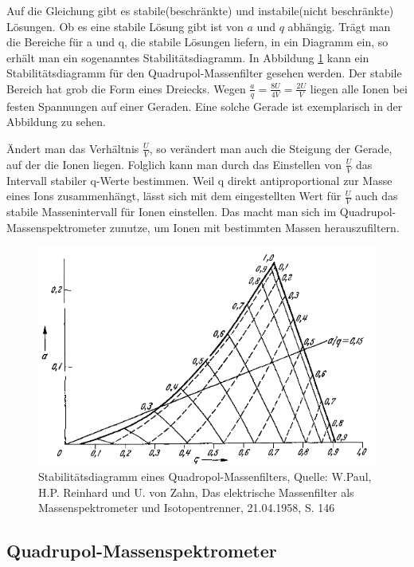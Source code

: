 \documentclass[10pt,a4paper]{article}
\begin{document}
Auf die Gleichung gibt es stabile(beschränkte) und instabile(nicht beschränkte) Lösungen. Ob es eine stabile Lösung gibt ist von $a$ und $q$ abhängig. Trägt man die Bereiche für a und q, die stabile Lösungen liefern, in ein Diagramm ein, so erhält man ein sogenanntes Stabilitätsdiagramm. In Abbildung \ref{stabilitatsdiagramm1} kann ein Stabilitätsdiagramm für den Quadrupol-Massenfilter gesehen werden. Der stabile Bereich hat grob die Form eines Dreiecks. Wegen $\frac{a}{q} = \frac{8 U}{4 V} = \frac{2 U}{V}$ liegen alle Ionen bei festen Spannungen auf einer Geraden. Eine solche Gerade ist exemplarisch in der Abbildung zu sehen. 

Ändert man das Verhältnis $\frac{U}{V}$, so verändert man auch die Steigung der Gerade, auf der die Ionen liegen. Folglich kann man durch das Einstellen von $\frac{U}{V}$ das Intervall stabiler q-Werte bestimmen. Weil q direkt antiproportional zur Masse eines Ions zusammenhängt, lässt sich mit dem eingestellten Wert für $\frac{U}{V}$ auch das stabile Massenintervall für Ionen einstellen. Das macht man sich im Quadrupol-Massenspektrometer zunutze, um Ionen mit bestimmten Massen herauszufiltern.

\begin{figure}[h]
	\centering
	\includegraphics[scale = 0.8]{stabilitatsdiagramm.png}
	\caption{Stabilitätsdiagramm eines Quadropol-Massenfilters, Quelle: W.Paul, H.P. Reinhard und U. von Zahn, Das elektrische Massenfilter als Massenspektrometer und Isotopentrenner, 21.04.1958, S. 146}
	\label{stabilitatsdiagramm1}
\end{figure}

\subsection{Quadrupol-Massenspektrometer}
\end{document}
